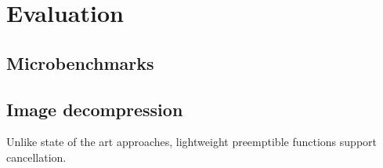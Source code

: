 \section{Evaluation}




\subsection{Microbenchmarks}




\subsection{Image decompression}

Unlike state of the art approaches, lightweight preemptible functions support
cancellation.
\begin{sloppypar}

\end{sloppypar}
